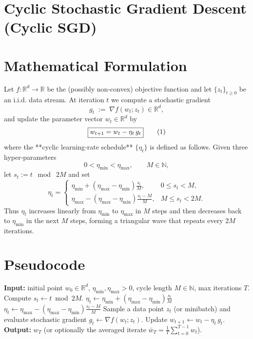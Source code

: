 \documentclass{article}
\newcommand{\R}{\mathbb{R}}
\begin{document}
\section*{Cyclic Stochastic Gradient Descent (Cyclic SGD)}

\section*{Mathematical Formulation}
Let $f:\R^{d}\to\R$ be the (possibly non‑convex) objective function and let $\{z_t\}_{t\ge0}$ be an i.i.d. data stream.  
At iteration $t$ we compute a stochastic gradient
\[
g_t \;:=\; \nabla f(w_t;z_t)\in\R^{d},
\]
and update the parameter vector $w_t\in\R^{d}$ by
\begin{equation}
\boxed{%
w_{t+1}=w_t-\eta_t\, g_t
}\tag{1}
\end{equation}
where the **cyclic learning‑rate schedule** $\{\eta_t\}$ is defined as follows.
Given three hyper‑parameters
\[
0<\eta_{\min}<\eta_{\max},\qquad M\in\mathbb{N},
\]
let $s_t:=t\;\bmod\; 2M$ and set
\[
\eta_t=
\begin{cases}
\displaystyle 
\eta_{\min}+(\eta_{\max}-\eta_{\min})\frac{s_t}{M},
& 0\le s_t<M,\\[2ex]
\displaystyle 
\eta_{\max}-(\eta_{\max}-\eta_{\min})\frac{s_t-M}{M},
& M\le s_t<2M .
\end{cases}
\tag{2}
\]
Thus $\eta_t$ increases linearly from $\eta_{\min}$ to $\eta_{\max}$ in $M$ steps and then decreases back to $\eta_{\min}$ in the next $M$ steps, forming a triangular wave that repeats every $2M$ iterations.

\section*{Pseudocode}
\begin{algorithm}[H]
\caption{Cyclic Stochastic Gradient Descent}
\begin{algorithmic}[1]
\State \textbf{Input:} initial point $w_0\in\R^{d}$, \; $\eta_{\min},\eta_{\max}>0$, cycle length $M\in\mathbb{N}$, \; max iterations $T$.
    \State Compute $s_t \gets t \bmod 2M$.
        \State $\eta_t \gets \eta_{\min}+(\eta_{\max}-\eta_{\min})\frac{s_t}{M}$ 
    \Else
        \State $\eta_t \gets \eta_{\max}-(\eta_{\max}-\eta_{\min})\frac{s_t-M}{M}$ 
    \EndIf
    \State Sample a data point $z_t$ (or minibatch) and evaluate stochastic gradient $g_t\gets \nabla f(w_t;z_t)$.
    \State Update $w_{t+1}\gets w_t-\eta_t\,g_t$.
\EndFor
\State \textbf{Output:} $w_T$ (or optionally the averaged iterate $\bar w_T=\frac1T\sum_{t=0}^{T-1}w_t$).
\end{algorithmic}
\end{algorithm}
\end{document}

